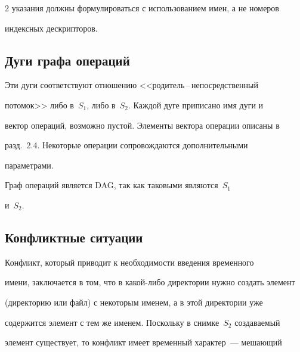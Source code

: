 \begin{multicols}{2}
указания должны формулироваться с использованием имен, а не номеров 


индексных де\-скрип\-то\-ров. 





\vspace*{-3pt}


\subsection{Дуги графа операций}


\vspace*{-1pt}





      Эти дуги соответствуют отношению <<родитель\,--\,непосредственный 


потомок>> либо в~$S_1$, либо в~$S_2$. Каждой дуге приписано имя дуги и 


вектор операций, возможно пустой. Элементы вектора операции описаны в 


разд.~2.4. Некоторые операции со\-про\-вож\-да\-ют\-ся дополнительными 


параметрами. 


      


      Граф операций является DAG, так как таковыми являются~$S_1$ 


и~$S_2$.





\vspace*{-3pt}


\subsection{Конфликтные ситуации}


\vspace*{-1pt}





      Конфликт, который приводит к необходимости введения временного 


имени, заключается в том, что в какой-либо директории нужно создать элемент 


(директорию или файл) с некоторым именем, а в этой директории уже 


содержится элемент с тем же именем. Поскольку в снимке~$S_2$ создаваемый 


элемент существует, то конфликт имеет временный характер~--- мешающий 



\end{multicols}
